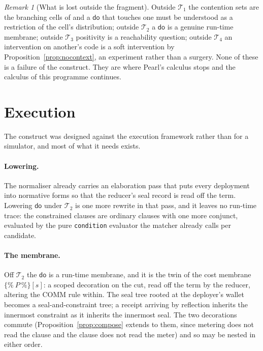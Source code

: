 \documentclass[11pt,a4paper]{article}
\theoremstyle{plain}
\theoremstyle{definition}
\theoremstyle{remark}
\newtheorem{remark}[theorem]{Remark}
\newcommand{\dok}{\textsf{do}}
\begin{document}
\begin{remark}[What is lost outside the fragment]
Outside $\mathcal{T}_1$ the contention sets are the branching cells of
\cite{AbbesBenveniste} and a $\dok$ that touches one must be understood as a
restriction of the cell's distribution; outside $\mathcal{T}_2$ a $\dok$ is a
genuine run-time membrane; outside $\mathcal{T}_3$ positivity is a reachability
question; outside $\mathcal{T}_4$ an intervention on another's code is a soft
intervention by Proposition~\ref{prop:nocontext}, an experiment rather than a
surgery. None of these is a failure of the construct. They are where Pearl's
calculus stops and the calculus of this programme continues.
\end{remark}

\section{Execution}\label{sec:execution}

The construct was designed against the execution framework rather than for a
simulator, and most of what it needs exists.

\paragraph{Lowering.} The normaliser already carries an elaboration pass that
puts every deployment into normative forms so that the reducer's seal record is
read off the term. Lowering $\dok$ under $\mathcal{T}_2$ is one more rewrite in
that pass, and it leaves no run-time trace: the constrained clauses are
ordinary clauses with one more conjunct, evaluated by the pure
\texttt{condition} evaluator the matcher already calls per candidate.

\paragraph{The membrane.} Off $\mathcal{T}_2$ the $\dok$ is a run-time membrane,
and it is the twin of the cost membrane $\{\%\ P\ \%\}[s]$: a scoped decoration
on the cut, read off the term by the reducer, altering the COMM rule within.
The seal tree rooted at the deployer's wallet becomes a seal-and-constraint
tree; a receipt arriving by reflection inherits the innermost constraint as it
inherits the innermost seal. The two decorations commute
(Proposition~\ref{prop:compose} extends to them, since metering does not read
the clause and the clause does not read the meter) and so may be nested in
either order.
\end{document}
